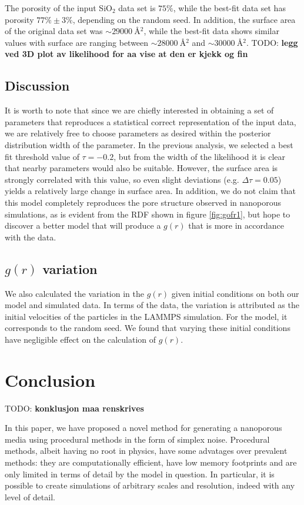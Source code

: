 \documentclass[aps,pre,twocolumn,letterpaper,floatfix,showpacs]{revtex4}
\newcommand{\todo}[1]{ {\color{Magenta} TODO: \color{Blue} \textbf{#1} }}
\begin{document}
The porosity of the input SiO$_2$ data set is $75\%$, while the best-fit data set has porosity $77\% \pm 3 \%$, depending on the random seed. In addition, the surface area of the original data set was $\sim \SI{29000}{\angstrom^2}$, while the best-fit data shows similar values with surface are ranging between $\sim \SI{28000}{\angstrom^2}$ and $\sim \SI{30000}{\angstrom^2}$.
\todo{legg ved 3D plot av likelihood for aa vise at den er kjekk og fin}

\subsection{Discussion}
It is worth to note that since we are chiefly interested in obtaining a set of parameters that reproduces a statistical correct representation of the input data, we are relatively free to choose parameters as desired within the posterior distribution width of the parameter. In the previous analysis, we selected a best fit threshold value of $\tau=-0.2$, but from the width of the likelihood it is clear that nearby parameters would also be suitable. However, the surface area is strongly correlated with this value, so even slight deviations (e.g. $\Delta \tau = 0.05$) yields a relatively large change in surface area. In addition, we do not claim that this model completely reproduces the pore structure observed in nanoporous simulations, as is evident from the RDF shown in figure \ref{fig:gofr1}, but hope to discover a better model that will produce a $g(r)$ that is more in accordance with the data.

\subsection{$g(r)$ variation}
We also calculated the variation in the $g(r)$ given initial conditions on both our model and simulated data. In terms of the data, the variation is attributed as the initial velocities of the particles in the LAMMPS simulation. For the model, it corresponds to the random seed. We found that varying these initial conditions have negligible effect on the calculation of $g(r)$.



\section{Conclusion}
\todo{konklusjon maa renskrives}

In this paper, we have proposed a novel method for generating a nanoporous media using procedural methods in the form of simplex noise. Procedural methods, albeit having no root in physics, have some advatages over prevalent methods: they are computationally efficient, have low memory footprints and are only limited in terms of detail by the model in question. In particular, it is possible to create simulations of arbitrary scales and resolution, indeed with any level of detail. 
\end{document}
